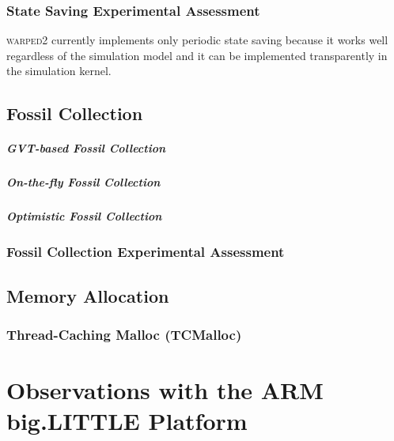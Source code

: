 \documentclass[11pt]{book}
\newcommand{\showPlots}[3]{
  \begin{figure}
    \begin{minipage}{.5\textwidth}
      \begin{center}
        \texttt{[image: figs/traffic/\#1]} \\
        Traffic Model \\
      \end{center}
    \end{minipage} \hfill
    \begin{minipage}{.5\textwidth}
      \begin{center}
        \texttt{[image: figs/pcs/\#1]} \\
        PCS Model \\
      \end{center}
    \end{minipage}
    \begin{minipage}{.5\textwidth}
      \begin{center}
        \texttt{[image: figs/epidemic/\#1]} \\
        Epidemic Model \\
      \end{center}
    \end{minipage} \hfill
    \begin{minipage}{.5\textwidth}
      \begin{center}
        \texttt{[image: figs/airport/\#1]} \\
        Airport Model \\
      \end{center}
    \end{minipage}
    \caption{#3}\label{#2}
  \end{figure}
}
\begin{document}
\subsection{State Saving Experimental Assessment}

\textsc{warped2} currently implements only periodic state saving because it works well
regardless of the simulation model and it can be implemented transparently in the simulation
kernel.


\section{Fossil Collection}



\paragraph{GVT-based Fossil Collection}

\paragraph{On-the-fly Fossil Collection}

\paragraph{Optimistic Fossil Collection}

\subsection{Fossil Collection Experimental Assessment}


\section{Memory Allocation}

\subsection{Thread-Caching Malloc (TCMalloc)}

\chapter{Observations with the ARM big.LITTLE Platform}
\end{document}

